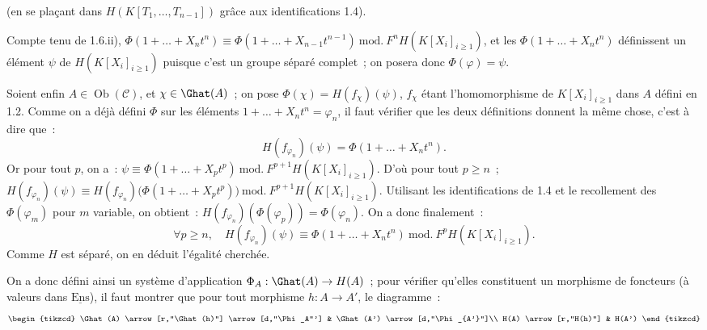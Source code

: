 
(en se plaçant
dans \(H(K[T_1,\ldots,T_{n-1}])\) grâce aux identifications 1.4).

Compte tenu de 1.6.ii), \(\Phi(1+\ldots+X_nt^n)\equiv\Phi(1+\ldots+X_{n-1}t^{n-1})\ \mathrm{mod.}\ F^nH(K[X_i]_{i\geq1})\), et les \(\Phi(1+\ldots+X_nt^n)\) définissent un élément \(\psi\) de \(H(K[X_i]_{i\geq1})\) puisque c'est un groupe séparé complet~; on posera donc \(\Phi(\varphi)=\psi\).

Soient enfin \(A\in\operatorname{Ob}(\mathcal C)\), et \(\chi\in\Ghat(A)\)~; on pose \(\Phi(\chi)=H(f_\chi)(\psi)\), \(f_\chi\) étant l'homomorphisme de \(K[X_i]_{i\geq 1}\) dans \(A\) défini en 1.2. Comme on a déjà défini \(\Phi\) sur les éléments \(1+\ldots+X_nt^n=\varphi_n\), il faut vérifier que les deux définitions donnent la même chose, c'est à dire que~:
\[
  H(f_{\varphi_n})(\psi)=\Phi(1+\ldots+X_nt^n).
\]
Or pour tout \(p\), on a~: \(\psi\equiv \Phi(1+\ldots+X_pt^p)\ \mathrm{mod.}\ F^{p+1}H(K[X_i]_{i\geq 1})\). D'où pour tout \(p\geq n\)~; \(H(f_{\varphi_n})(\psi)\equiv H(f_{\varphi_n})\bigl(\Phi(1+\ldots+X_pt^p)\bigr)\ \mathrm{mod.}\ F^{p+1}H(K[X_i]_{i\geq 1})\). Utilisant les identifications de 1.4 et le recollement des \(\Phi(\varphi_m)\) pour \(m\) variable, on obtient~: \(H(f_{\varphi_n})(\Phi(\varphi_p))=\Phi(\varphi_n)\).
On a donc finalement~:
\[
  \forall p\geq n,\quad
  H(f_{\varphi_n})(\psi)\equiv \Phi(1+\ldots+X_nt^n)
  \ \mathrm{mod.}\ F^pH(K[X_i]_{i\geq 1}).
\]
Comme \(H\) est séparé, on en déduit l'égalité cherchée.

On a donc défini ainsi un système d'application \(\Phi_A:\Ghat(A)\to H(A)\)~; pour vérifier qu'elles constituent un morphisme de foncteurs (à valeurs dans \(\underline{\mathrm{Ens}}\)), il faut montrer que pour tout morphisme \(h:A\to A'\), le diagramme~:
\[
\begin{tikzcd}
\Ghat(A) \arrow[r,"\Ghat(h)"] \arrow[d,"\Phi_A"'] &
\Ghat(A') \arrow[d,"\Phi_{A'}"]\\
H(A) \arrow[r,"H(h)"] & H(A')
\end{tikzcd}
\]
